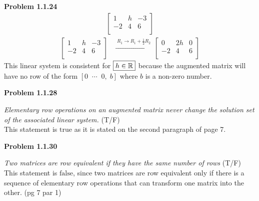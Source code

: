 \documentclass[12pt]{article}
\begin{document}
\newpage

\textbf{Problem 1.1.24} \begin{align*}
    \begin{bmatrix}
        1 & h & -3 \\
        -2 & 4 & 6 \\
    \end{bmatrix}
\end{align*} \begin{align*}
    \begin{bmatrix}
        1 & h & -3 \\
        -2 & 4 & 6 \\
    \end{bmatrix} 
    & \xrightarrow{\; R_1 \to R_1 + \frac{1}{2}R_2 \;}
    \begin{bmatrix}
        0 & 2h & 0 \\
        -2 & 4 & 6 \\
    \end{bmatrix} 
\end{align*}
This linear system is consistent for $\boxed{h \in \mathbb{R}}$ because the augmented matrix will have no row of the form $[0 \;\; \cdots \;\; 0, \; b]$ where $b$ is a non-zero number. \par

\newpage

\textbf{Problem 1.1.28} \par
\textit{Elementary row operations on an augmented matrix never change the solution set of the associated linear system.} (T/F) \\[12pt]
This statement is $\boxed{\text{true}}$ as it is stated on the second paragraph of page 7.

\newpage

\textbf{Problem 1.1.30} \par
\textit{Two matrices are row equivalent if they have the same number of rows} (T/F) \\[12pt]
This statement is $\boxed{\text{false}}$, since two matrices are row equivalent only if there is a sequence of elementary row operations that can transform one matrix into the other. (pg 7 par 1)

\newpage
\end{document}

